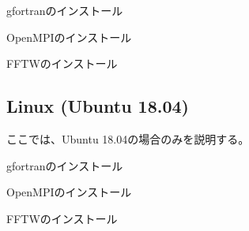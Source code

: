 \documentclass[letterpaper,10pt,dvipdfmx,report]{sphinxmanual}
\begin{document}
gfortranのインストール

\begin{sphinxVerbatim}[commandchars=\\\{\}]
  
\end{sphinxVerbatim}

OpenMPIのインストール

\begin{sphinxVerbatim}[commandchars=\\\{\}]
  
\end{sphinxVerbatim}

FFTWのインストール

\begin{sphinxVerbatim}[commandchars=\\\{\}]
  
\end{sphinxVerbatim}


\subsection{Linux (Ubuntu 18.04)}
\label{\detokenize{environment:linux-ubuntu-18-04}}
ここでは、Ubuntu 18.04の場合のみを説明する。

gfortranのインストール

\begin{sphinxVerbatim}[commandchars=\\\{\}]
   
\end{sphinxVerbatim}

OpenMPIのインストール

\begin{sphinxVerbatim}[commandchars=\\\{\}]
     
\end{sphinxVerbatim}

FFTWのインストール

\begin{sphinxVerbatim}[commandchars=\\\{\}]
   
\end{sphinxVerbatim}
\end{document}
